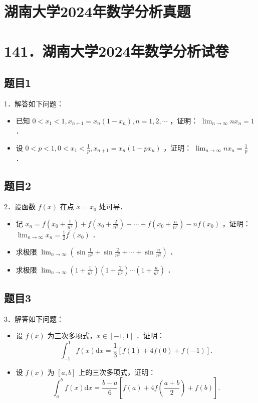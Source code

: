 \documentclass{article}
\begin{document}
\section*{湖南大学2024年数学分析真题}
\section*{141．湖南大学2024年数学分析试卷}

\subsection{题目1}
1．解答如下问题：

\begin{itemize}
  \item[（1）] 已知 \(0<x_{1}<1, x_{n+1}=x_{n}\left(1-x_{n}\right), n=1,2, \cdots\) ，证明： \(\lim _{n \rightarrow \infty} n x_{n}=1\) ．
  \item[（2）] 设 \(0<p<1,0<x_{1}<\frac{1}{p}, x_{n+1}=x_{n}\left(1-p x_{n}\right)\) ，证明： \(\lim _{n \rightarrow \infty} n x_{n}=\frac{1}{p}\) ．
\end{itemize}

\subsection{题目2}
2．设函数 \(f(x)\) 在点 \(x=x_{0}\) 处可导．

\begin{itemize}
  \item[（1）] 记 \(x_{n}=f\left(x_{0}+\frac{1}{n^{2}}\right)+f\left(x_{0}+\frac{2}{n^{2}}\right)+\cdots+f\left(x_{0}+\frac{n}{n^{2}}\right)-n f\left(x_{0}\right)\) ，证明： \(\lim _{n \rightarrow \infty} x_{n}=\frac{1}{2} f^{\prime}\left(x_{0}\right)\) ．
  \item[（2）] 求极限 \(\lim _{n \rightarrow \infty}\left(\sin \frac{1}{n^{2}}+\sin \frac{2}{n^{2}}+\cdots+\sin \frac{n}{n^{2}}\right)\) ．
  \item[（3）] 求极限 \(\lim _{n \rightarrow \infty}\left(1+\frac{1}{n^{2}}\right)\left(1+\frac{2}{n^{2}}\right) \cdots\left(1+\frac{n}{n^{2}}\right)\) ．
\end{itemize}

\subsection{题目3}
3．解答如下问题：

\begin{itemize}
  \item[（1）] 设 \(f(x)\) 为三次多项式，\(x \in[-1,1]\) ．证明：
\[
\int_{-1}^{1} f(x) \mathrm{d} x=\frac{1}{3}[f(1)+4 f(0)+f(-1)] .
\]
  \item[（2）] 设 \(f(x)\) 为 \([a, b]\) 上的三次多项式，证明：
\[
\int_{a}^{b} f(x) \mathrm{d} x=\frac{b-a}{6}\left[f(a)+4 f\left(\frac{a+b}{2}\right)+f(b)\right] .
\]
\end{itemize}
\end{document}
